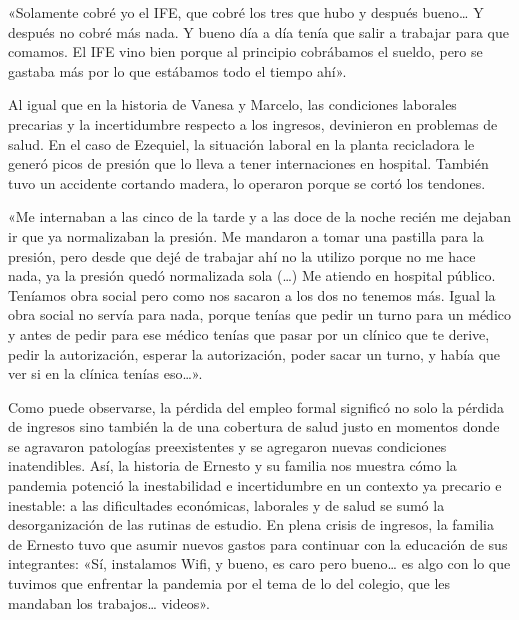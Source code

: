 \begin{refsection}
\begin{gbcita}
«Solamente cobré yo el IFE, que cobré los tres que hubo y después bueno… Y después no cobré más nada. Y bueno día a día tenía que salir a trabajar para que comamos. El IFE vino bien porque al principio cobrábamos el sueldo, pero se gastaba más por lo que estábamos todo el tiempo ahí».

\end{gbcita}

Al igual que en la historia de Vanesa y Marcelo, las condiciones laborales precarias y la incertidumbre respecto a los ingresos, devinieron en problemas de salud. En el caso de Ezequiel, la situación laboral en la planta recicladora le generó picos de presión que lo lleva a tener internaciones en hospital. También tuvo un accidente cortando madera, lo operaron porque se cortó los tendones.


\begin{gbcita}
«Me internaban a las cinco de la tarde y a las doce de la noche recién me dejaban ir que ya normalizaban la presión. Me mandaron a tomar una pastilla para la presión, pero desde que dejé de trabajar ahí no la utilizo porque no me hace nada, ya la presión quedó normalizada sola (…) Me atiendo en hospital público. Teníamos obra social pero como nos sacaron a los dos no tenemos más. Igual la obra social no servía para nada, porque tenías que pedir un turno para un médico y antes de pedir para ese médico tenías que pasar por un clínico que te derive, pedir la autorización, esperar la autorización, poder sacar un turno, y había que ver si en la clínica tenías eso…».

\end{gbcita}

Como puede observarse, la pérdida del empleo formal significó no solo la pérdida de ingresos sino también la de una cobertura de salud justo en momentos donde se agravaron patologías preexistentes y se agregaron nuevas condiciones inatendibles. Así, la historia de Ernesto y su familia nos muestra cómo la pandemia potenció la inestabilidad e incertidumbre en un contexto ya precario e inestable: a las dificultades económicas, laborales y de salud se sumó la desorganización de las rutinas de estudio. En plena crisis de ingresos, la familia de Ernesto tuvo que asumir nuevos gastos para continuar con la educación de sus integrantes: «Sí, instalamos Wifi, y bueno, es caro pero bueno… es algo con lo que tuvimos que enfrentar la pandemia por el tema de lo del colegio, que les mandaban los trabajos… videos».


\end{refsection}
